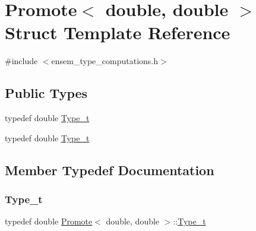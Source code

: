 \hypertarget{structPromote_3_01double_00_01double_01_4}{}\section{Promote$<$ double, double $>$ Struct Template Reference}
\label{structPromote_3_01double_00_01double_01_4}


{\ttfamily \#include $<$ensem\+\_\+type\+\_\+computations.\+h$>$}

\subsection*{Public Types}
\begin{DoxyCompactItemize}
\item 
typedef double \mbox{\hyperlink{structPromote_3_01double_00_01double_01_4_a1183eb3c61824b2ad80a7c7e7524974a}{Type\+\_\+t}}
\item 
typedef double \mbox{\hyperlink{structPromote_3_01double_00_01double_01_4_a1183eb3c61824b2ad80a7c7e7524974a}{Type\+\_\+t}}
\end{DoxyCompactItemize}


\subsection{Member Typedef Documentation}
\mbox{\label{structPromote_3_01double_00_01double_01_4_a1183eb3c61824b2ad80a7c7e7524974a}} 
\subsubsection{\texorpdfstring{Type\_t}{Type\_t}\hspace{0.1cm}{\footnotesize\ttfamily [1/2]}}
{\footnotesize\ttfamily typedef double \mbox{\hyperlink{structPromote}{Promote}}$<$ double, double $>$\+::\mbox{\hyperlink{structPromote_3_01double_00_01double_01_4_a1183eb3c61824b2ad80a7c7e7524974a}{Type\+\_\+t}}}

\mbox{\label{structPromote_3_01double_00_01double_01_4_a1183eb3c61824b2ad80a7c7e7524974a}} 
